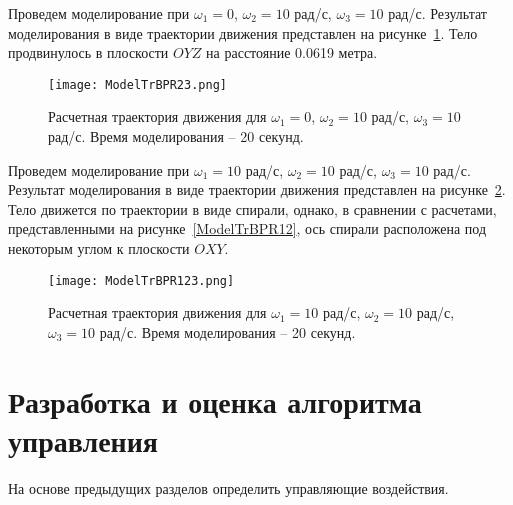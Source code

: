 Проведем моделирование при $\omega_1=0$, $\omega_2=10$ рад/с, $\omega_3=10$ рад/с. Результат моделирования в виде траектории движения представлен на рисунке~\ref{ModelTrBPR23}. Тело продвинулось в плоскости $OYZ$ на расстояние 0.0619 метра.

\begin{figure}[h]
	\centering
	\texttt{[image: ModelTrBPR23.png]}%
	\caption{Расчетная траектория движения для $\omega_1=0$, $\omega_2=10$ рад/с, $\omega_3=10$ рад/с. Время моделирования -- 20 секунд.}
	\label{ModelTrBPR23}
\end{figure}

Проведем моделирование при $\omega_1=10$ рад/с, $\omega_2=10$ рад/с, $\omega_3=10$ рад/с. Результат моделирования в виде траектории движения представлен на рисунке~\ref{ModelTrBPR123}. Тело движется по траектории в виде спирали, однако, в сравнении с расчетами, представленными на рисунке~\ref{ModelTrBPR12}, ось спирали расположена под некоторым углом к плоскости $OXY$.

\begin{figure}[h]
	\centering
	\texttt{[image: ModelTrBPR123.png]}%
	\caption{Расчетная траектория движения для $\omega_1=10$ рад/с, $\omega_2=10$ рад/с, $\omega_3=10$ рад/с. Время моделирования -- 20 секунд.}
	\label{ModelTrBPR123}
\end{figure}



\section{Разработка и оценка алгоритма управления}

На основе предыдущих разделов определить управляющие воздействия.

	
	


